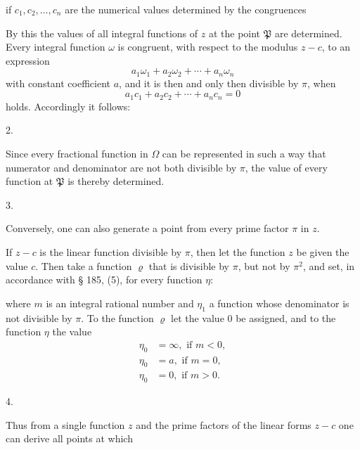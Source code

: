 if $c_1, c_2, \ldots, c_n$ are the numerical values determined by the congruences


By this the values of all integral functions of $z$ at the point $\mathfrak{P}$ are determined. Every integral function $\omega$ is congruent, with respect to the modulus $z - c$, to an expression
\[
a_1\omega_1 + a_2\omega_2 + \cdots + a_n\omega_n
\]
with constant coefficient $a$, and it is then and only then divisible by $\pi$, when
\[
a_1c_1 + a_2c_2 + \cdots + a_nc_n = 0
\]
holds. Accordingly it follows:

2. 

Since every fractional function in $\Omega$ can be represented in such a way that numerator and denominator are not both divisible by $\pi$, the value of every function at $\mathfrak{P}$ is thereby determined.

3. 

Conversely, one can also generate a point from every prime factor $\pi$ in $z$.

If $z - c$ is the linear function divisible by $\pi$, then let the function $z$ be given the value $c$. Then take a function $\varrho$ that is divisible by $\pi$, but not by $\pi^2$, and set, in accordance with § 185, (5), for every function $\eta$:


where $m$ is an integral rational number and $\eta_1$ a function whose denominator is not divisible by $\pi$. To the function $\varrho$ let the value 0 be assigned, and to the function $\eta$ the value
\[
\begin{aligned}
\eta_0 &= \infty, \text{ if } m < 0,\\
\eta_0 &= a, \text{ if } m = 0,\\
\eta_0 &= 0, \text{ if } m > 0.
\end{aligned}
\]

4. 

Thus from a single function $z$ and the prime factors of the linear forms $z - c$ one can derive all points at which
